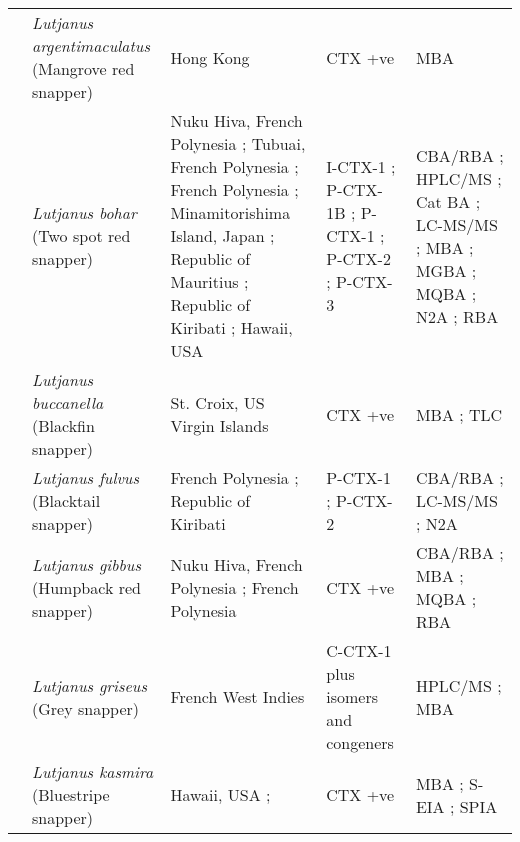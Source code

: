 \documentclass[12pt]{article}
\begin{document}
\begin{longtable}{ | p{2cm} | p{3cm} | p{4.5cm} | p{2cm} | p{3cm} | }
	& \emph{Lutjanus argentimaculatus} (Mangrove red snapper) & Hong Kong \cite{wong2008features} & CTX +ve \cite{wong2008features} & MBA \cite{wong2008features} \\
	& \emph{Lutjanus bohar} (Two spot red snapper) & Nuku Hiva, French Polynesia \cite{darius2007ciguatera}; Tubuai, French Polynesia \cite{darius2007ciguatera}; French Polynesia \cite{bagnis1987use,chinain2014mail}; Minamitorishima Island, Japan \cite{yogi2011detailed}; Republic of Mauritius \cite{hamilton2002multiple,hamilton2002isolation}; Republic of Kiribati \cite{mak2013pacific}; Hawaii, USA \cite{hokama1990simplified} & I-CTX-1 \cite{hamilton2002multiple,hamilton2002isolation}; P-CTX-1B \cite{yogi2011detailed}; P-CTX-1 \cite{mak2013pacific}; P-CTX-2 \cite{mak2013pacific}; P-CTX-3 \cite{mak2013pacific} & CBA/RBA \cite{chinain2014mail}; HPLC/MS \cite{hamilton2002multiple,hamilton2002isolation}; Cat BA \cite{bagnis1987use}; LC-MS/MS \cite{yogi2011detailed,mak2013pacific}; MBA \cite{hamilton2002multiple,bagnis1987use,hamilton2002isolation}; MGBA \cite{hamilton2002multiple,hamilton2002isolation}; MQBA \cite{bagnis1987use}; N2A \cite{mak2013pacific}; RBA \cite{darius2007ciguatera} \\
	& \emph{Lutjanus buccanella} (Blackfin snapper) & St. Croix, US Virgin Islands \cite{hoffman1983mouse} & CTX +ve \cite{hoffman1983mouse} & MBA \cite{hoffman1983mouse}; TLC \cite{hoffman1983mouse} \\
	& \emph{Lutjanus fulvus} (Blacktail snapper) & French Polynesia \cite{chinain2014mail}; Republic of Kiribati \cite{mak2013pacific} & P-CTX-1 \cite{mak2013pacific}; P-CTX-2 \cite{mak2013pacific} & CBA/RBA \cite{chinain2014mail}; LC-MS/MS \cite{mak2013pacific}; N2A \cite{mak2013pacific} \\
	& \emph{Lutjanus gibbus} (Humpback red snapper) & Nuku Hiva, French Polynesia \cite{darius2007ciguatera}; French Polynesia \cite{bagnis1987use,chinain2014mail} & CTX +ve \cite{darius2007ciguatera,bagnis1987use,chinain2014mail} & CBA/RBA \cite{chinain2014mail}; MBA \cite{bagnis1987use}; MQBA \cite{bagnis1987use}; RBA \cite{darius2007ciguatera} \\
	& \emph{Lutjanus griseus} (Grey snapper) & French West Indies \cite{pottier2002analysis} & C-CTX-1 plus isomers and congeners \cite{pottier2002analysis} & HPLC/MS \cite{pottier2002analysis}; MBA \cite{pottier2002analysis}\\
	& \emph{Lutjanus kasmira} (Bluestripe snapper) & Hawaii, USA \cite{hokama1993evaluation};& CTX +ve \cite{hokama1993evaluation} & MBA \cite{hokama1993evaluation}; S-EIA \cite{hokama1993evaluation}; SPIA \cite{hokama1993evaluation} \\

\end{longtable}
\end{document}
